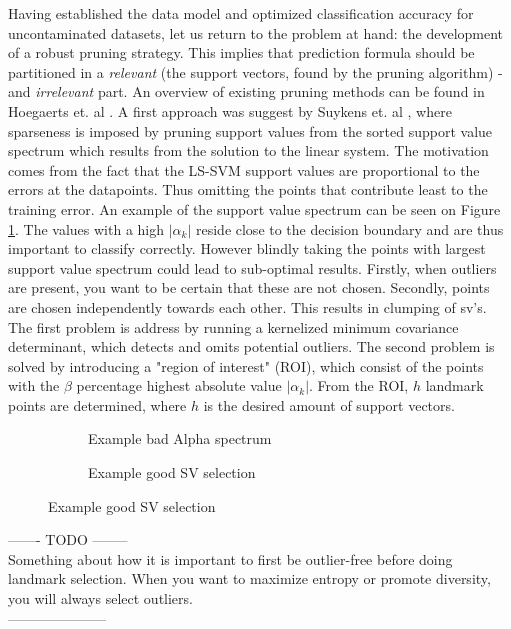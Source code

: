 \documentclass[preprint,12pt]{elsarticle}
\begin{document}
Having established the data model and optimized classification accuracy for uncontaminated datasets, let us return to the problem at hand: the development of a robust pruning strategy. This implies that prediction formula should be partitioned in a \textit{relevant} (the support vectors, found by the pruning algorithm) - and \textit{irrelevant} part.  An overview of existing pruning methods can be found in Hoegaerts et. al \cite{hoegaerts2004comparison}. A first approach was suggest by Suykens et. al \cite{suykens2000sparse}, where  sparseness is imposed by pruning support values from the sorted support value spectrum which results from the solution to the linear system.  The motivation comes from the fact that the LS-SVM support values are proportional to the errors at the datapoints. Thus omitting the points that contribute least to the training error. An example of the support value spectrum can be seen on Figure \ref{fig:BadAlpha}. The values with a high $|\alpha_k|$ reside close to the decision boundary and are thus important to classify correctly. However blindly taking the points with largest support value spectrum could lead to sub-optimal results. Firstly, when outliers are present, you want to be certain that these are not chosen. Secondly, points are chosen independently towards each other. This results in clumping of sv's. The first problem is address by running a kernelized minimum covariance determinant, which detects and omits potential outliers. The second problem is solved by introducing a "region of interest" (ROI), which consist of the points with the $\beta$ percentage highest absolute value $|\alpha_k|$. From the ROI, $h$ landmark points are determined, where $h$ is the desired amount of support vectors.

\begin{figure}[h]
	\centering
	\begin{subfigure}[b]{0.3\textwidth}
		\label{fig:BadAlpha}
		\caption{Example bad Alpha spectrum}
	\end{subfigure}
	\begin{subfigure}[b]{0.3\textwidth}
		\label{fig:GoodPruning}
		\caption{Example good SV selection}
	\end{subfigure}
\end{figure}

\noindent
------- TODO -------- \\
Something about how it is important to first be outlier-free before doing landmark selection. When you want to maximize entropy or promote diversity, you will always select outliers.\\
---------------------
\end{document}
